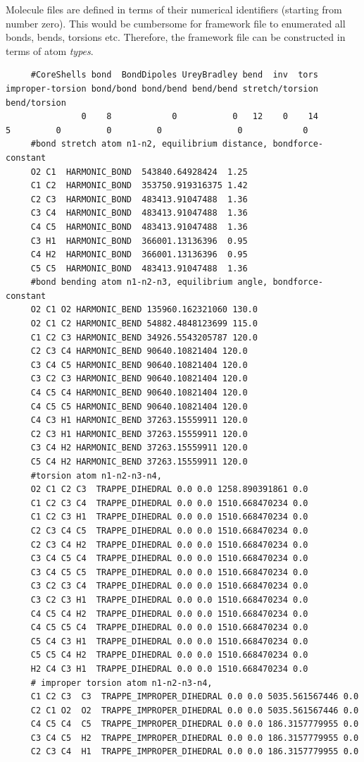\noindent
Molecule files are defined in terms of their numerical identifiers (starting from number zero).
This would be cumbersome for framework file to enumerated all bonds, bends, torsions etc.
Therefore, the framework file can be constructed in terms of atom \emph{types}.
\begin{tiny}
\begin{verbatim}
     #CoreShells bond  BondDipoles UreyBradley bend  inv  tors improper-torsion bond/bond bond/bend bend/bend stretch/torsion bend/torsion
               0    8            0           0   12    0    14                5         0         0         0               0            0
     #bond stretch atom n1-n2, equilibrium distance, bondforce-constant
     O2 C1  HARMONIC_BOND  543840.64928424  1.25
     C1 C2  HARMONIC_BOND  353750.919316375 1.42
     C2 C3  HARMONIC_BOND  483413.91047488  1.36
     C3 C4  HARMONIC_BOND  483413.91047488  1.36
     C4 C5  HARMONIC_BOND  483413.91047488  1.36
     C3 H1  HARMONIC_BOND  366001.13136396  0.95
     C4 H2  HARMONIC_BOND  366001.13136396  0.95
     C5 C5  HARMONIC_BOND  483413.91047488  1.36
     #bond bending atom n1-n2-n3, equilibrium angle, bondforce-constant
     O2 C1 O2 HARMONIC_BEND 135960.162321060 130.0
     O2 C1 C2 HARMONIC_BEND 54882.4848123699 115.0
     C1 C2 C3 HARMONIC_BEND 34926.5543205787 120.0
     C2 C3 C4 HARMONIC_BEND 90640.10821404 120.0
     C3 C4 C5 HARMONIC_BEND 90640.10821404 120.0
     C3 C2 C3 HARMONIC_BEND 90640.10821404 120.0
     C4 C5 C4 HARMONIC_BEND 90640.10821404 120.0
     C4 C5 C5 HARMONIC_BEND 90640.10821404 120.0
     C4 C3 H1 HARMONIC_BEND 37263.15559911 120.0
     C2 C3 H1 HARMONIC_BEND 37263.15559911 120.0
     C3 C4 H2 HARMONIC_BEND 37263.15559911 120.0
     C5 C4 H2 HARMONIC_BEND 37263.15559911 120.0
     #torsion atom n1-n2-n3-n4,
     O2 C1 C2 C3  TRAPPE_DIHEDRAL 0.0 0.0 1258.890391861 0.0
     C1 C2 C3 C4  TRAPPE_DIHEDRAL 0.0 0.0 1510.668470234 0.0
     C1 C2 C3 H1  TRAPPE_DIHEDRAL 0.0 0.0 1510.668470234 0.0
     C2 C3 C4 C5  TRAPPE_DIHEDRAL 0.0 0.0 1510.668470234 0.0
     C2 C3 C4 H2  TRAPPE_DIHEDRAL 0.0 0.0 1510.668470234 0.0
     C3 C4 C5 C4  TRAPPE_DIHEDRAL 0.0 0.0 1510.668470234 0.0
     C3 C4 C5 C5  TRAPPE_DIHEDRAL 0.0 0.0 1510.668470234 0.0
     C3 C2 C3 C4  TRAPPE_DIHEDRAL 0.0 0.0 1510.668470234 0.0
     C3 C2 C3 H1  TRAPPE_DIHEDRAL 0.0 0.0 1510.668470234 0.0
     C4 C5 C4 H2  TRAPPE_DIHEDRAL 0.0 0.0 1510.668470234 0.0
     C4 C5 C5 C4  TRAPPE_DIHEDRAL 0.0 0.0 1510.668470234 0.0
     C5 C4 C3 H1  TRAPPE_DIHEDRAL 0.0 0.0 1510.668470234 0.0
     C5 C5 C4 H2  TRAPPE_DIHEDRAL 0.0 0.0 1510.668470234 0.0
     H2 C4 C3 H1  TRAPPE_DIHEDRAL 0.0 0.0 1510.668470234 0.0
     # improper torsion atom n1-n2-n3-n4,
     C1 C2 C3  C3  TRAPPE_IMPROPER_DIHEDRAL 0.0 0.0 5035.561567446 0.0
     C2 C1 O2  O2  TRAPPE_IMPROPER_DIHEDRAL 0.0 0.0 5035.561567446 0.0
     C4 C5 C4  C5  TRAPPE_IMPROPER_DIHEDRAL 0.0 0.0 186.3157779955 0.0
     C3 C4 C5  H2  TRAPPE_IMPROPER_DIHEDRAL 0.0 0.0 186.3157779955 0.0
     C2 C3 C4  H1  TRAPPE_IMPROPER_DIHEDRAL 0.0 0.0 186.3157779955 0.0
\end{verbatim}
\end{tiny}

